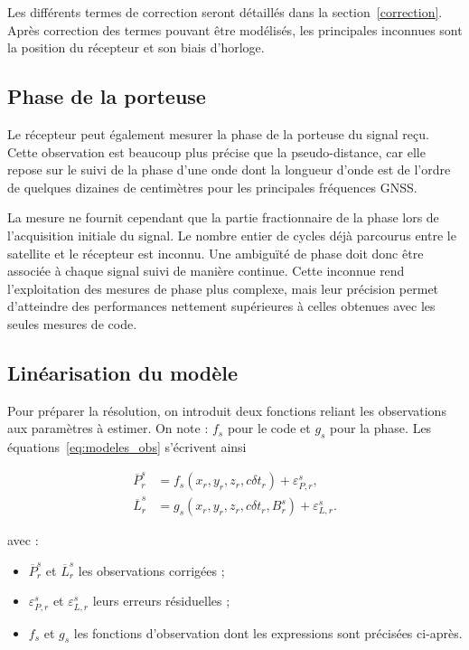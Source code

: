 Les différents termes de correction seront détaillés dans la
section~\ref{correction}. Après correction des termes pouvant être modélisés,
les principales inconnues sont la position du récepteur et son biais
d'horloge.

\subsection{Phase de la porteuse}

Le récepteur peut également mesurer la phase de la porteuse du signal reçu.
Cette observation est beaucoup plus précise que la pseudo-distance, car elle
repose sur le suivi de la phase d'une onde dont la longueur d'onde est de
l'ordre de quelques dizaines de centimètres pour les principales fréquences
GNSS.

La mesure ne fournit cependant que la partie fractionnaire de la phase lors de
l'acquisition initiale du signal. Le nombre entier de cycles déjà parcourus
entre le satellite et le récepteur est inconnu. Une ambiguïté de phase doit
donc être associée à chaque signal suivi de manière continue. Cette inconnue
rend l'exploitation des mesures de phase plus complexe, mais leur précision
permet d'atteindre des performances nettement supérieures à celles obtenues
avec les seules mesures de code.

\subsection{Linéarisation du modèle}

Pour préparer la résolution, on introduit deux fonctions reliant les observations aux paramètres à estimer. On note :
$f_s$ pour le code et $g_s$ pour la phase. Les
équations~\eqref{eq:modeles_obs} s'écrivent ainsi

\begin{align}
\overline P_r^s
&=f_s(x_r,y_r,z_r,c\delta t_r)+\varepsilon_{P,r}^s,
\\
\overline L_r^s
&=g_s(x_r,y_r,z_r,c\delta t_r,B_r^s)+\varepsilon_{L,r}^s.
\label{eq:explicit_observation_functions}
\end{align}

avec :

\begin{itemize}
    \item $\overline P_r^s$ et $\overline L_r^s$ les observations corrigées ;
    \item $\varepsilon_{P,r}^s$ et $\varepsilon_{L,r}^s$ leurs erreurs
    résiduelles ;
    \item $f_s$ et $g_s$ les fonctions d'observation dont les expressions
    sont précisées ci-après.
\end{itemize}


